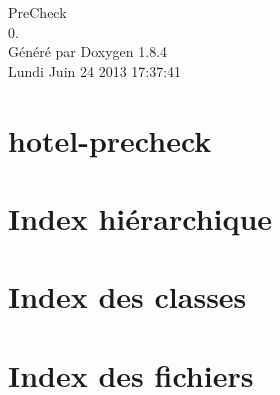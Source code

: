 \documentclass[twoside]{book}
\newcommand{\clearemptydoublepage}{%
  \newpage{\pagestyle{empty}\cleardoublepage}%
}
\begin{document}
\hypersetup{pageanchor=false}
\begin{titlepage}
\vspace*{7cm}
\begin{center}%
{\Large Pre\-Check \\[1ex]\large 0. }\\
\vspace*{1cm}
{\large Généré par Doxygen 1.8.4}\\
\vspace*{0.5cm}
{\small Lundi Juin 24 2013 17:37:41}\\
\end{center}
\end{titlepage}
\clearemptydoublepage
\tableofcontents
\clearemptydoublepage
{}
\hypersetup{pageanchor=true}

\chapter{hotel-\/precheck}
\label{md__home_tiff_Stage-IUT_app_simplhotel_hotel-precheck_README}
\hypertarget{md__home_tiff_Stage-IUT_app_simplhotel_hotel-precheck_README}{}

\chapter{Index hiérarchique}

\chapter{Index des classes}

\chapter{Index des fichiers}

\end{document}
